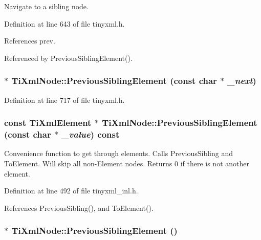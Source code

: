 Navigate to a sibling node. 

Definition at line 643 of file tinyxml.h.

References prev.

Referenced by PreviousSiblingElement().\hypertarget{class_ti_xml_node_a976f74fdd0e49a53502ebf1eda8e63a9}{
\subsubsection[{PreviousSiblingElement}]{$\ast$ TiXmlNode::PreviousSiblingElement (const char $\ast$ {\em \_\-next})}}
\label{class_ti_xml_node_a976f74fdd0e49a53502ebf1eda8e63a9}


Definition at line 717 of file tinyxml.h.\hypertarget{class_ti_xml_node_ab6997616e51877d861676159c9bd345a}{
\subsubsection[{PreviousSiblingElement}]{\setlength{\rightskip}{0pt plus 5cm}const {\bf TiXmlElement} $\ast$ TiXmlNode::PreviousSiblingElement (const char $\ast$ {\em \_\-value}) const}}
\label{class_ti_xml_node_ab6997616e51877d861676159c9bd345a}
Convenience function to get through elements. Calls PreviousSibling and ToElement. Will skip all non-\/Element nodes. Returns 0 if there is not another element. 

Definition at line 492 of file tinyxml\_\-inl.h.

References PreviousSibling(), and ToElement().\hypertarget{class_ti_xml_node_a9f7092efa127c3190df5cf3cb97e887d}{
\subsubsection[{PreviousSiblingElement}]{$\ast$ TiXmlNode::PreviousSiblingElement ()}}
\label{class_ti_xml_node_a9f7092efa127c3190df5cf3cb97e887d}


